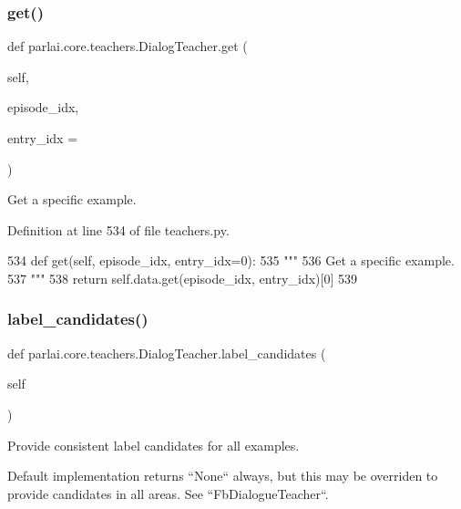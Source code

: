 \subsubsection{\texorpdfstring{get()}{get()}}
{\footnotesize\ttfamily def parlai.\+core.\+teachers.\+Dialog\+Teacher.\+get (\begin{DoxyParamCaption}\item[{}]{self,  }\item[{}]{episode\+\_\+idx,  }\item[{}]{entry\+\_\+idx = {} }\end{DoxyParamCaption})}

\begin{DoxyVerb}Get a specific example.
\end{DoxyVerb}
 

Definition at line 534 of file teachers.\+py.


\begin{DoxyCode}
534     \textcolor{keyword}{def }get(self, episode\_idx, entry\_idx=0):
535         \textcolor{stringliteral}{"""}
536 \textcolor{stringliteral}{        Get a specific example.}
537 \textcolor{stringliteral}{        """}
538         \textcolor{keywordflow}{return} self.data.get(episode\_idx, entry\_idx)[0]
539 
\end{DoxyCode}
\mbox{\label{classparlai_1_1core_1_1teachers_1_1DialogTeacher_a50649105cc9d00bcaa860290d804eac9}} 
\subsubsection{\texorpdfstring{label\+\_\+candidates()}{label\_candidates()}}
{\footnotesize\ttfamily def parlai.\+core.\+teachers.\+Dialog\+Teacher.\+label\+\_\+candidates (\begin{DoxyParamCaption}\item[{}]{self }\end{DoxyParamCaption})}

\begin{DoxyVerb}Provide consistent label candidates for all examples.

Default implementation returns ``None`` always, but this may be overriden to
provide candidates in all areas. See ``FbDialogueTeacher``.
\end{DoxyVerb}
 

